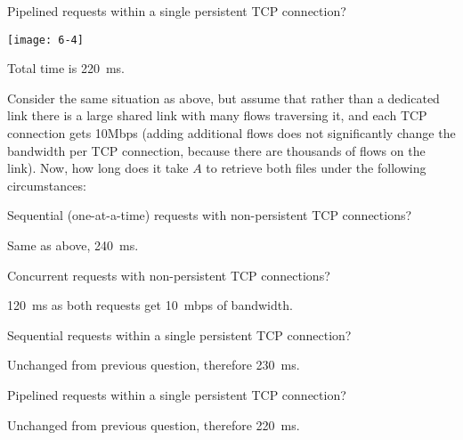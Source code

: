 \documentclass{supervision}
\begin{document}
\begin{questions}
\begin{parts}
\begin{subparts}
\begin{subsubparts}
              \subsubpart Pipelined requests within a single persistent TCP
                connection?
                \begin{solution}
                  \begin{center}
                    \texttt{[image: 6-4]}
                  \end{center}
                  Total time is \SI{220}{ms}.
                \end{solution}

            \end{subsubparts}
          \subpart Consider the same situation as above, but assume that rather
            than a dedicated link there is a large shared link with many flows
            traversing it, and each TCP connection gets 10Mbps (adding
            additional flows does not significantly change the bandwidth per
            TCP connection, because there are thousands of flows on the link).
            Now, how long does it take $A$ to retrieve both files under the
            following circumstances:
            \begin{subsubparts}
              \subsubpart Sequential (one-at-a-time) requests with
                non-persistent TCP connections?
                \begin{solution}
                  Same as above, \SI{240}{ms}.
                \end{solution}

              \subsubpart Concurrent requests with non-persistent TCP
                connections?
                \begin{solution}
                  \SI{120}{ms} as both requests get \SI{10}{mbps} of bandwidth.
                \end{solution}

              \subsubpart Sequential requests within a single persistent TCP
                connection?
                \begin{solution}
                  Unchanged from previous question, therefore \SI{230}{ms}.
                \end{solution}

              \subsubpart Pipelined requests within a single persistent TCP
                connection?
                \begin{solution}
                  Unchanged from previous question, therefore \SI{220}{ms}.
                \end{solution}


\end{subsubparts}
\end{subparts}
\end{parts}
\end{questions}
\end{document}
